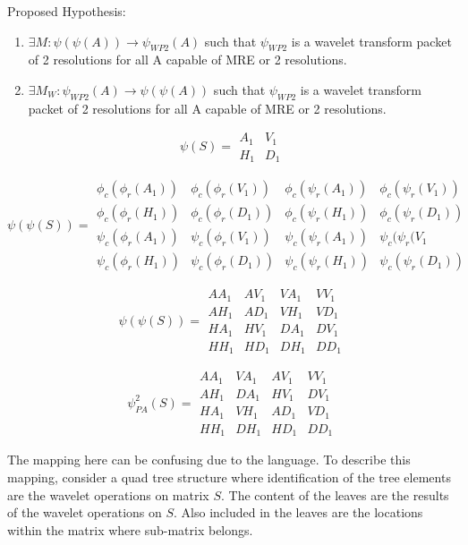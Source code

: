 
Proposed Hypothesis: 
 \begin{enumerate}
 \item $\exists M:\psi (\psi (A)) \to \psi_{WP2} (A) $ such that $\psi_{WP2}$ is a wavelet transform packet of 2 resolutions for all A capable of MRE or 2 resolutions.  
 \item $\exists M_W:\psi_{WP2} (A)  \to \psi (\psi (A)) $ such that $\psi_{WP2}$ is a wavelet transform packet of 2 resolutions for all A capable of MRE or 2 resolutions.  
\end{enumerate}


\[\psi (S)=
\begin{array}{cc}
A_{1} & V_{1} \\ 
H_1 & D_1
\end{array}
\]

\[\psi(\psi (S))=
\begin{array}{cccc}
\phi_c(\phi_r (A_1)) & \phi_c(\phi_r(V_1)) & \phi_c(\psi_r(A_1)) & \phi_c(\psi_r(V_1)) \\ 
\phi_c(\phi_r(H_1)) & \phi_c(\phi_r(D_1)) & \phi_c(\psi_r(H_1)) & \phi_c(\psi_r(D_1)) \\ 
\psi_c(\phi_r(A_1)) & \psi_c(\phi_r(V_1)) & \psi_c(\psi_r(A_1)) & \psi_c(\psi_r(V_1 \\ 
\psi_c(\phi_r(H_1)) & \psi_c(\phi_r(D_1)) & \psi_c(\psi_r(H_1)) & \psi_c(\psi_r(D_1))
\end{array}
\]

\[\psi(\psi (S))=
\begin{array}{cccc}
AA_1 & AV_1 & VA_1 & VV_1 \\ 
AH_1 & AD_1 & VH_1 & VD_1 \\ 
HA_1 & HV_1 & DA_1 & DV_1 \\ 
HH_1 & HD_1 & DH_1 & DD_1
\end{array}
\]

\[\psi_{PA}^2(S)=
\begin{array}{cccc}
AA_1 & VA_1 &  AV_1& VV_1 \\ 
AH_1 &  DA_1&   HV_1 & DV_1 \\ 
HA_1 & VH_1 &  AD_1& VD_1 \\ 
HH_1 &  DH_1 &HD_1 & DD_1
\end{array}
\]

The mapping here can be confusing due to the language.  To describe this mapping, consider a quad tree structure where %
identification of the tree elements are the wavelet %
operations on matrix $S$.  The content of the leaves are the results of the wavelet %
operations on %
$S$.  Also included in the leaves are the locations within the matrix where %
sub-matrix belongs. %

